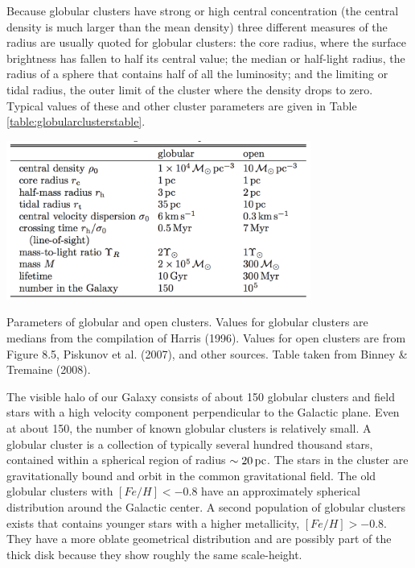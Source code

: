 \documentclass[a4paper,10pt]{article}
\begin{document}
{\noindent}Because globular clusters have strong or high central concentration (the central density is much larger than the mean density) three different measures of the radius are usually quoted for globular clusters: the core radius, where the surface brightness has fallen to half its central value; the median or half-light radius, the radius of a sphere that contains half of all the luminosity; and the limiting or tidal radius, the outer limit of the cluster where the density drops to zero. Typical values of these and other cluster parameters are given in Table \ref{table:globularclusterstable}.

\begin{table}[h!]
    \centering
    \includegraphics[width=10cm]{figures/GlobularClustersTable.png}
    \caption{\footnotesize{Parameters of globular and open clusters. Values for globular clusters are medians from the compilation of Harris (1996). Values for open clusters are from Figure 8.5, Piskunov et al. (2007), and other sources. Table taken from Binney \& Tremaine (2008).}}
    \label{table:globularclusterstable}
\end{table}

{\noindent}The visible halo of our Galaxy consists of about 150 globular clusters and field stars with a high velocity component perpendicular to the Galactic plane. Even at about 150, the number of known globular clusters is relatively small. A globular cluster is a collection of typically several hundred thousand stars, contained within a spherical region of radius $\sim20\,{\rm pc}$. The stars in the cluster are gravitationally bound and orbit in the common gravitational field. The old globular clusters with $[Fe/H]<-0.8$ have an approximately spherical distribution around the Galactic center. A second population of globular clusters exists that contains younger stars with a higher metallicity, $[Fe/H]>-0.8$. They have a more oblate geometrical distribution and are possibly part of the thick disk because they show roughly the same scale-height.
\end{document}
